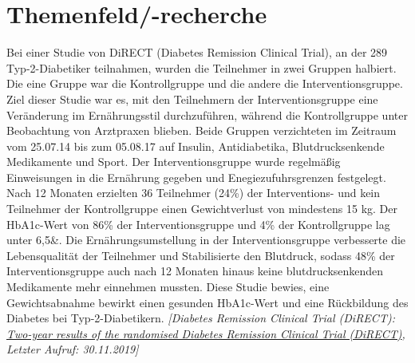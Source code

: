 \documentclass[a4paper,11pt]{article}%
\renewcommand{\\}{\vspace*{0.5\baselineskip} \newline}
\begin{document}
\section{Themenfeld/-recherche}
	Bei einer Studie von DiRECT (Diabetes Remission Clinical Trial), an der 289 Typ-2-Diabetiker teilnahmen, wurden die Teilnehmer in zwei Gruppen halbiert. Die eine Gruppe war die Kontrollgruppe und die andere die Interventionsgruppe. Ziel dieser Studie war es, mit den Teilnehmern der Interventionsgruppe eine Veränderung im Ernährungsstil durchzuführen, während die Kontrollgruppe unter Beobachtung von Arztpraxen blieben. Beide Gruppen verzichteten im Zeitraum vom 25.07.14 bis zum 05.08.17 auf Insulin, Antidiabetika, Blutdrucksenkende Medikamente und Sport. Der Interventionsgruppe wurde regelmäßig Einweisungen in die Ernährung gegeben und Enegiezufuhrsgrenzen festgelegt. Nach 12 Monaten erzielten 36 Teilnehmer (24\%) der Interventions- und kein Teilnehmer der Kontrollgruppe einen Gewichtverlust von mindestens 15 kg. Der HbA1c-Wert von 86\% der Interventionsgruppe und 4\% der Kontrollgruppe lag unter 6,5\&. Die Ernährungsumstellung in der Interventionsgruppe verbesserte die Lebensqualität der Teilnehmer und Stabilisierte den Blutdruck, sodass 48\% der Interventionsgruppe auch nach 12 Monaten hinaus keine blutdrucksenkenden Medikamente mehr einnehmen mussten. Diese Studie bewies, eine Gewichtsabnahme bewirkt einen gesunden HbA1c-Wert und eine Rückbildung des Diabetes bei Typ-2-Diabetikern.  \emph{[Diabetes Remission Clinical Trial (DiRECT):
		\href{https://www.directclinicaltrial.org.uk/Pubfiles/Final\%20accepted\%20draft,\%20prior\%20to\%20editing\%20and\%20corrections.pdf}{Two-year results of the randomised Diabetes Remission Clinical Trial (DiRECT)},
		Letzter Aufruf: 30.11.2019]} 
\end{document}

